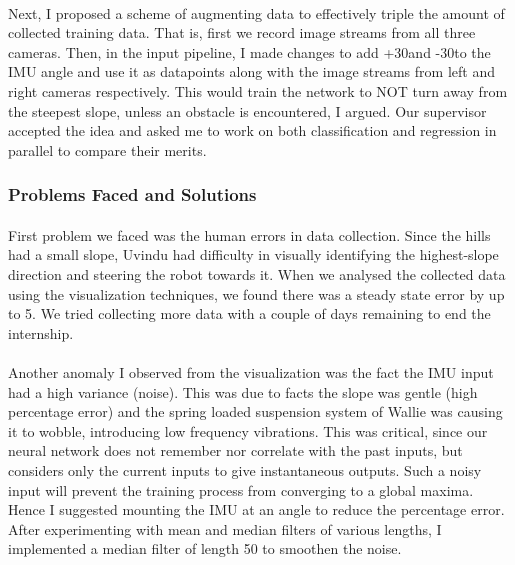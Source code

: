 \paragraph{}
Next, I proposed a scheme of augmenting data to effectively triple the amount of collected training data. That is, first we record image streams from all three cameras. Then, in the input pipeline, I made changes to add +30\degree and -30\degree to the IMU angle and use it as datapoints along with the image streams from left and right cameras respectively. This would train the network to NOT turn away from the steepest slope, unless an obstacle is encountered, I argued. Our supervisor accepted the idea and asked me to work on both classification and regression in parallel to compare their merits. 



\subsubsection{Problems Faced and Solutions}

\paragraph{}
First problem we faced was the human errors in data collection. Since the hills had a small slope, Uvindu had difficulty in visually identifying the highest-slope direction and steering the robot towards it. When we analysed the collected data using the visualization techniques, we found there was a steady state error by up to 5\degree. We tried collecting more data with a couple of days remaining to end the internship.

\paragraph{}
Another anomaly I observed from the visualization was the fact the IMU input had a high variance (noise). This was due to facts the slope was gentle (high percentage error) and the spring loaded suspension system of Wallie was causing it to wobble, introducing low frequency vibrations. This was critical, since our neural network does not remember nor correlate with the past inputs, but considers only the current inputs to give instantaneous outputs. Such a noisy input will prevent the training process from converging to a global maxima. Hence I suggested mounting the IMU at an angle to reduce the percentage error. After experimenting with mean and median filters of various lengths, I implemented a median filter of length 50 to smoothen the noise.

